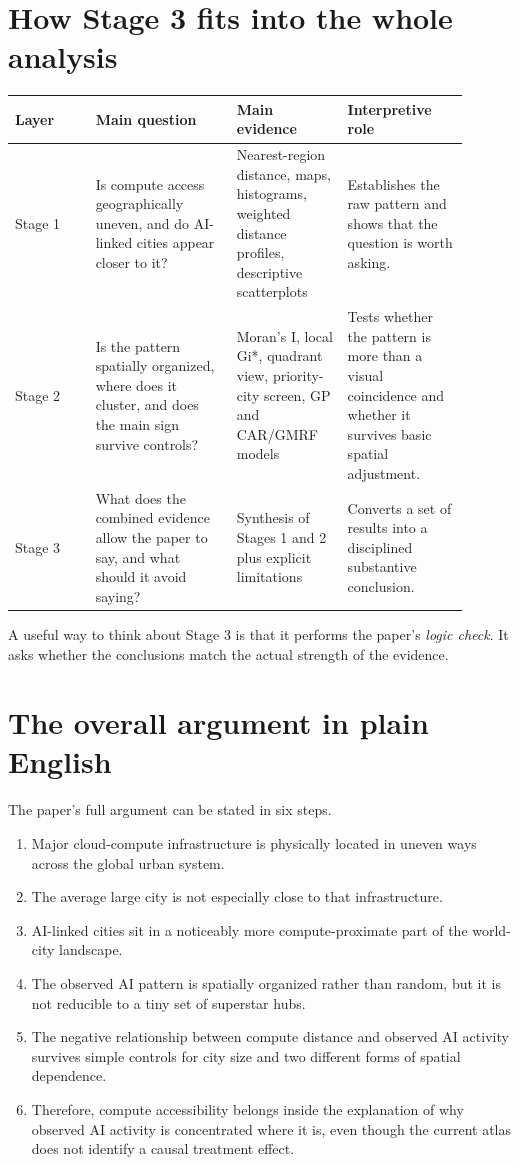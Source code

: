 \documentclass[11pt]{article}
\begin{document}
\section{How Stage 3 fits into the whole analysis}
\begin{longtable}{>{\raggedright\arraybackslash}p{0.16\linewidth} >{\raggedright\arraybackslash}p{0.28\linewidth} >{\raggedright\arraybackslash}p{0.22\linewidth} >{\raggedright\arraybackslash}p{0.24\linewidth}}
\toprule
\textbf{Layer} & \textbf{Main question} & \textbf{Main evidence} & \textbf{Interpretive role} \\
\midrule
Stage 1 & Is compute access geographically uneven, and do AI-linked cities appear closer to it? & Nearest-region distance, maps, histograms, weighted distance profiles, descriptive scatterplots & Establishes the raw pattern and shows that the question is worth asking. \\
Stage 2 & Is the pattern spatially organized, where does it cluster, and does the main sign survive controls? & Moran's I, local Gi*, quadrant view, priority-city screen, GP and CAR/GMRF models & Tests whether the pattern is more than a visual coincidence and whether it survives basic spatial adjustment. \\
Stage 3 & What does the combined evidence allow the paper to say, and what should it avoid saying? & Synthesis of Stages 1 and 2 plus explicit limitations & Converts a set of results into a disciplined substantive conclusion. \\
\bottomrule
\end{longtable}

A useful way to think about Stage 3 is that it performs the paper's \emph{logic check}. It asks whether the conclusions match the actual strength of the evidence.

\section{The overall argument in plain English}
The paper's full argument can be stated in six steps.
\begin{enumerate}[leftmargin=*]
    \item Major cloud-compute infrastructure is physically located in uneven ways across the global urban system.
    \item The average large city is not especially close to that infrastructure.
    \item AI-linked cities sit in a noticeably more compute-proximate part of the world-city landscape.
    \item The observed AI pattern is spatially organized rather than random, but it is not reducible to a tiny set of superstar hubs.
    \item The negative relationship between compute distance and observed AI activity survives simple controls for city size and two different forms of spatial dependence.
    \item Therefore, compute accessibility belongs inside the explanation of why observed AI activity is concentrated where it is, even though the current atlas does not identify a causal treatment effect.
\end{enumerate}
\end{document}
